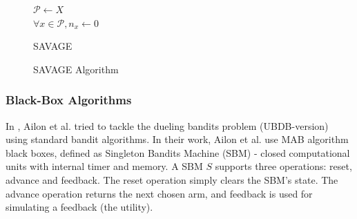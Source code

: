 \documentclass{llncs}
\begin{document}
\begin{figure}[h]
	\IncMargin{1em}
		\begin{algorithm}[H]
		
			$ \mathcal{P} \leftarrow X $\\
			$ \forall x \in \mathcal{P} , n_x \leftarrow 0 $\\
		\BlankLine
			\caption{SAVAGE}
		\end{algorithm}
		\caption{SAVAGE Algorithm}\label{algo_SAVAGE}
	\end{figure}
	\newpage
	
\subsubsection{Black-Box Algorithms}	
	In \cite{??}, Ailon et al. tried to tackle the dueling bandits problem (UBDB-version) using standard bandit algorithms.
	In their work, Ailon et al. use MAB algorithm black boxes, defined as Singleton Bandits Machine (SBM) - closed computational units with internal timer and memory.
	A SBM $S$ supports three operations: reset, advance and feedback. The reset operation simply clears the SBM's state.
	The advance operation returns the next chosen arm, and feedback is used for simulating a feedback (the utility).
\end{document}
